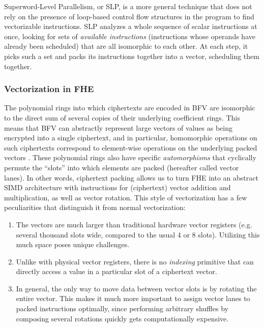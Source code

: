 Superword-Level Parallelism, or SLP, is a more general technique that does not rely on the presence of loop-based control flow structures in the program to find vectorizable instructions.
SLP analyzes a whole sequence of scalar instructions at once, looking for sets of {\em available instructions} (instructions whose operands have already been scheduled) that are all isomorphic to each other.
At each step, it picks such a set and packs its instructions together into a vector, scheduling them together.

\subsubsection*{Vectorization in FHE}
The polynomial rings into which ciphertexts are encoded in BFV are isomorphic to the direct sum of several copies of their underlying coefficient rings.
This means that BFV can abstractly represent large vectors of values as being encrypted into a single ciphertext, and in particular, homomorphic operations on such ciphertexts correspond to element-wise operations on the underlying packed vectors \cite{BrakerskiPacking}.
These polynomial rings also have specific {\em automorphisms} that cyclically permute the ``slots'' into which elements are packed (hereafter called vector lanes). 
In other words, ciphertext packing allows us to turn FHE into an abstract SIMD architecture with instructions for (ciphertext) vector addition and multiplication, as well as vector rotation.
This style of vectorization has a few peculiarities that distinguish it from normal vectorization:
\begin{enumerate}
    \item The vectors are much larger than traditional hardware vector registers (e.g. several thousand slots wide, compared to the usual 4 or 8 slots). Utilizing this much space poses unique challenges.
    \item Unlike with physical vector registers, there is no {\em indexing} primitive that can directly access a value in a particular slot of a ciphertext vector.
    \item In general, the only way to move data between vector slots is by rotating the entire vector. This makes it much more important to assign vector lanes to packed instructions optimally, since performing arbitrary shuffles by composing several rotations quickly gets computationally expensive.
\end{enumerate}

